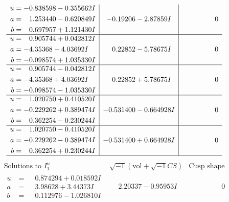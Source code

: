\documentclass[1p]{elsarticle_modified}
\theoremstyle{definition}
\newcommand{\I}{\sqrt{-1}}
\begin{document}
$$\begin{array}{c|c|c}
\begin{aligned}
u &= -0.838598 - 0.355662 I \\
a &= \phantom{-}1.253440 - 0.620849 I \\
b &= \phantom{-}0.697957 + 1.121430 I\end{aligned}
 & -0.19206 - 2.87859 I & \phantom{-0.000000 } 0 \\ \hline\begin{aligned}
u &= \phantom{-}0.905744 + 0.042812 I \\
a &= -4.35368 - 4.03692 I \\
b &= -0.098574 + 1.035330 I\end{aligned}
 & \phantom{-}0.22852 - 5.78675 I & \phantom{-0.000000 } 0 \\ \hline\begin{aligned}
u &= \phantom{-}0.905744 - 0.042812 I \\
a &= -4.35368 + 4.03692 I \\
b &= -0.098574 - 1.035330 I\end{aligned}
 & \phantom{-}0.22852 + 5.78675 I & \phantom{-0.000000 } 0 \\ \hline\begin{aligned}
u &= \phantom{-}1.020750 + 0.410520 I \\
a &= -0.229262 + 0.389474 I \\
b &= \phantom{-}0.362254 - 0.230244 I\end{aligned}
 & -0.531400 - 0.664928 I & \phantom{-0.000000 } 0 \\ \hline\begin{aligned}
u &= \phantom{-}1.020750 - 0.410520 I \\
a &= -0.229262 - 0.389474 I \\
b &= \phantom{-}0.362254 + 0.230244 I\end{aligned}
 & -0.531400 + 0.664928 I & \phantom{-0.000000 } 0\\
 \hline 
 \end{array}$$\newpage$$\begin{array}{c|c|c}  
\text{Solutions to }I^u_{1}& \I (\text{vol} + \sqrt{-1}CS) & \text{Cusp shape}\\
 \hline 
\begin{aligned}
u &= \phantom{-}0.874294 + 0.018592 I \\
a &= \phantom{-}3.98628 + 3.44373 I \\
b &= \phantom{-}0.112976 - 1.026810 I\end{aligned}
 & \phantom{-}2.20337 - 0.95953 I & \phantom{-0.000000 } 0 \\ \hline\begin{aligned}

\end{aligned}
\end{array}$$
\end{document}
